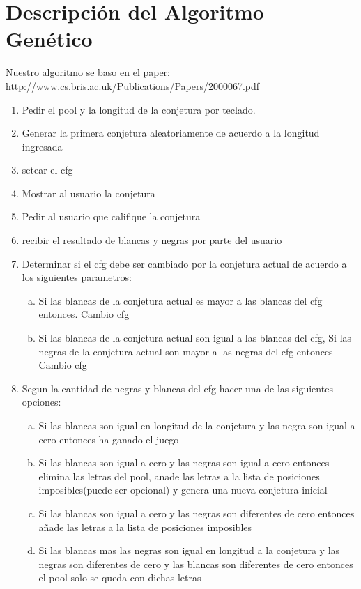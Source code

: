 \section{ Descripción del Algoritmo Genético}
Nuestro algoritmo se baso en el paper:
 \url {http://www.cs.bris.ac.uk/Publications/Papers/2000067.pdf}
\begin{enumerate}[1)]
 \item Pedir el pool y la longitud de la conjetura por teclado.
 \item Generar la primera conjetura aleatoriamente de acuerdo a la longitud ingresada
 \item setear el cfg
 \item  Mostrar al usuario la conjetura
  \item  Pedir al usuario que califique la conjetura
 \item recibir el resultado de blancas y negras por parte del usuario  
 \item Determinar si el cfg debe ser cambiado por la conjetura actual de acuerdo a los siguientes parametros:
         \begin{enumerate}[a)]
         \item Si las blancas de la conjetura actual es mayor a las  blancas del cfg entonces. Cambio cfg
         \item Si las blancas de la conjetura actual son igual a las  blancas del cfg, Si las negras de la conjetura actual son mayor a las  negras del cfg entonces Cambio cfg
    \end{enumerate}
 \item Segun la cantidad de negras y blancas del cfg hacer una de las siguientes opciones:
          \begin{enumerate}[a)]
         \item Si las blancas son igual en longitud de la conjetura y las negra son igual a cero entonces ha ganado el juego
         \item Si las blancas son igual a cero y las negras son igual a cero entonces elimina las letras del pool, anade las letras a la lista de posiciones imposibles(puede ser opcional) y genera una nueva conjetura inicial
         \item Si las blancas son igual a cero y las negras son diferentes de cero entonces añade las letras a la lista de posiciones imposibles
         \item Si las blancas mas las negras son igual en longitud a la conjetura y las negras son diferentes de cero y las blancas son diferentes de cero entonces el pool solo se queda con dichas letras

\end{enumerate}
\end{enumerate}
